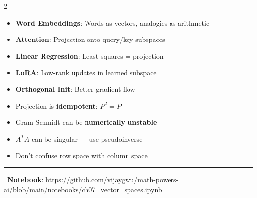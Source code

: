 \documentclass[11pt,letterpaper]{article}
\begin{document}
\begin{multicols}{2}
\begin{center}
\end{center}

\begin{tcolorbox}[appbox, title={\faRobot\ ML Applications}]
\begin{itemize}
    \item \textbf{Word Embeddings}: Words as vectors, analogies as arithmetic
    \item \textbf{Attention}: Projection onto query/key subspaces
    \item \textbf{Linear Regression}: Least squares = projection
    \item \textbf{LoRA}: Low-rank updates in learned subspace
    \item \textbf{Orthogonal Init}: Better gradient flow
\end{itemize}
\end{tcolorbox}

\begin{tcolorbox}[warningbox, title={\faExclamationTriangle\ Common Pitfalls}]
\begin{itemize}
    \item Projection is \textbf{idempotent}: $P^2 = P$
    \item Gram-Schmidt can be \textbf{numerically unstable}
    \item $A^T A$ can be singular --- use pseudoinverse
    \item Don't confuse row space with column space
\end{itemize}
\end{tcolorbox}

\end{multicols}

\vspace{5pt}
\hrule
\vspace{5pt}

\begin{center}
\faGithub\ \textbf{Notebook}: \url{https://github.com/vijaygwu/math-powers-ai/blob/main/notebooks/ch07_vector_spaces.ipynb}
\end{center}
\end{document}
